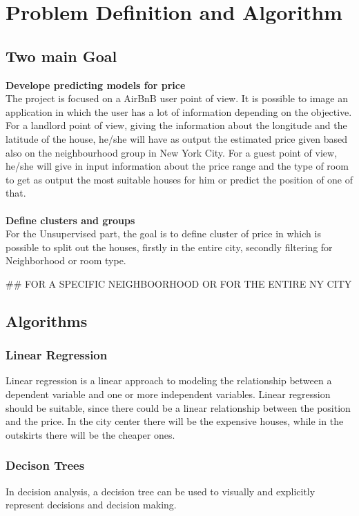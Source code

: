\documentclass{FR16}
\begin{document}
\newpage
\section{Problem Definition and Algorithm}
\subsection{Two main Goal}
\textbf{Develope predicting models for price}\\
The project is focused on a AirBnB user point of view. It is possible to image an application in which the user has a lot of information depending on the objective. For a landlord point of view, giving the information about the longitude and the latitude of the house, he/she will have as output the estimated price given based also on the neighbourhood group in New York City. For a guest point of view, he/she will give in input information about the price range and the type of room to get as output the most suitable houses for him or predict the position of one of that.\\\\
\textbf{Define clusters and groups}\\
For the Unsupervised part, the goal is to define cluster of price in which is possible to split out the houses, firstly in the entire city, secondly filtering for Neighborhood or room type. 

\#\# FOR A SPECIFIC NEIGHBOORHOOD OR FOR THE ENTIRE NY CITY
\subsection{Algorithms}
\subsubsection{Linear Regression}
 Linear regression  is a linear approach to modeling the relationship between a dependent variable and one or more independent variables. Linear regression should be suitable, since there could be a linear relationship between the position and the price. In the city center there will be the expensive houses, while in the outskirts there will be the cheaper ones.
  \subsubsection{Decison Trees}
In decision analysis, a decision tree can be used to visually and explicitly represent decisions and decision making.
\end{document}
